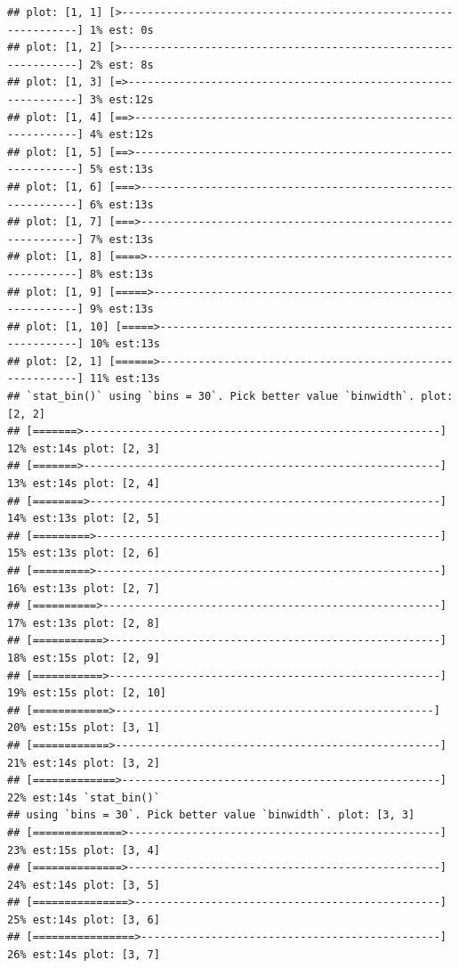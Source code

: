 \documentclass[
]{article}
\begin{document}
\begin{verbatim}
## plot: [1, 1] [>---------------------------------------------------------------] 1% est: 0s
## plot: [1, 2] [>---------------------------------------------------------------] 2% est: 8s
## plot: [1, 3] [=>--------------------------------------------------------------] 3% est:12s
## plot: [1, 4] [==>-------------------------------------------------------------] 4% est:12s
## plot: [1, 5] [==>-------------------------------------------------------------] 5% est:13s
## plot: [1, 6] [===>------------------------------------------------------------] 6% est:13s
## plot: [1, 7] [===>------------------------------------------------------------] 7% est:13s
## plot: [1, 8] [====>-----------------------------------------------------------] 8% est:13s
## plot: [1, 9] [=====>----------------------------------------------------------] 9% est:13s
## plot: [1, 10] [=====>---------------------------------------------------------] 10% est:13s
## plot: [2, 1] [======>---------------------------------------------------------] 11% est:13s
## `stat_bin()` using `bins = 30`. Pick better value `binwidth`. plot: [2, 2]
## [=======>--------------------------------------------------------] 12% est:14s plot: [2, 3]
## [=======>--------------------------------------------------------] 13% est:14s plot: [2, 4]
## [========>-------------------------------------------------------] 14% est:13s plot: [2, 5]
## [=========>------------------------------------------------------] 15% est:13s plot: [2, 6]
## [=========>------------------------------------------------------] 16% est:13s plot: [2, 7]
## [==========>-----------------------------------------------------] 17% est:13s plot: [2, 8]
## [===========>----------------------------------------------------] 18% est:15s plot: [2, 9]
## [===========>----------------------------------------------------] 19% est:15s plot: [2, 10]
## [============>--------------------------------------------------] 20% est:15s plot: [3, 1]
## [============>---------------------------------------------------] 21% est:14s plot: [3, 2]
## [=============>--------------------------------------------------] 22% est:14s `stat_bin()`
## using `bins = 30`. Pick better value `binwidth`. plot: [3, 3]
## [==============>-------------------------------------------------] 23% est:15s plot: [3, 4]
## [==============>-------------------------------------------------] 24% est:14s plot: [3, 5]
## [===============>------------------------------------------------] 25% est:14s plot: [3, 6]
## [================>-----------------------------------------------] 26% est:14s plot: [3, 7]

\end{verbatim}
\end{document}
